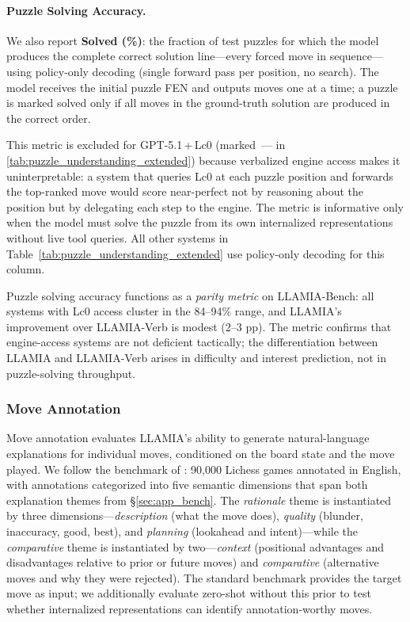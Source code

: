 \paragraph{Puzzle Solving Accuracy.}
\label{sec:app_bench_puzzle_solve}
We also report \textbf{Solved (\%)}: the fraction of test puzzles for which the model produces the complete correct solution line---every forced move in sequence---using policy-only decoding (single forward pass per position, no search). The model receives the initial puzzle FEN and outputs moves one at a time; a puzzle is marked solved only if all moves in the ground-truth solution are produced in the correct order.

This metric is excluded for GPT-5.1\,+\,Lc0 (marked~--- in \cref{tab:puzzle_understanding_extended}) because verbalized engine access makes it uninterpretable: a system that queries Lc0 at each puzzle position and forwards the top-ranked move would score near-perfect not by reasoning about the position but by delegating each step to the engine. The metric is informative only when the model must solve the puzzle from its own internalized representations without live tool queries. All other systems in Table~\ref{tab:puzzle_understanding_extended} use policy-only decoding for this column.

Puzzle solving accuracy functions as a \emph{parity metric} on LLAMIA-Bench: all systems with Lc0 access cluster in the 84--94\% range, and LLAMIA's improvement over LLAMIA-Verb is modest (2--3 pp). The metric confirms that engine-access systems are not deficient tactically; the differentiation between LLAMIA and LLAMIA-Verb arises in difficulty and interest prediction, not in puzzle-solving throughput.

\subsubsection{Move Annotation}
\label{sec:app_bench_annotation}

Move annotation evaluates LLAMIA's ability to generate natural-language explanations for individual moves, conditioned on the board state and the move played. We follow the benchmark of \citet{jhamtani-etal-2018-learning}: 90,000 Lichess games annotated in English, with annotations categorized into five semantic dimensions that span both explanation themes from \S\ref{sec:app_bench}. The \emph{rationale} theme is instantiated by three dimensions---\emph{description} (what the move does), \emph{quality} (blunder, inaccuracy, good, best), and \emph{planning} (lookahead and intent)---while the \emph{comparative} theme is instantiated by two---\emph{context} (positional advantages and disadvantages relative to prior or future moves) and \emph{comparative} (alternative moves and why they were rejected). The standard benchmark provides the target move as input; we additionally evaluate zero-shot without this prior to test whether internalized representations can identify annotation-worthy moves.

